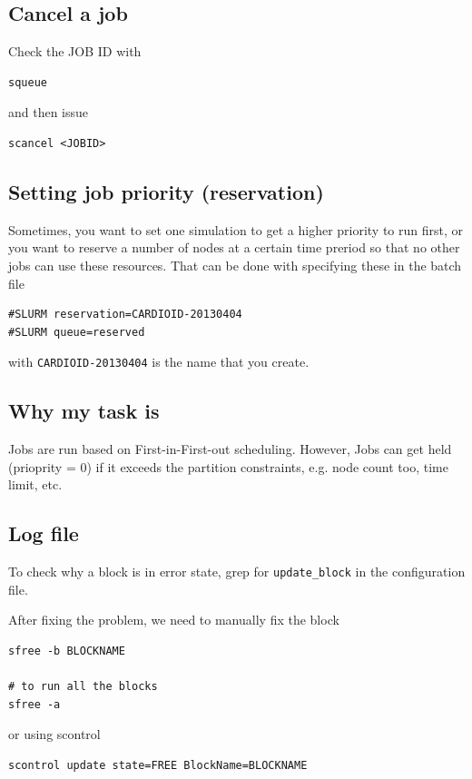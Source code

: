 \subsection{Cancel a job}

Check the JOB ID with 
\begin{verbatim}
squeue
\end{verbatim}

and then issue 
\begin{verbatim}
scancel <JOBID>
\end{verbatim}

\subsection{Setting job priority (reservation)}

Sometimes, you want to set one simulation to get a higher priority to run first,
or you want to reserve a number of nodes at a certain time preriod so that no
other jobs can use these resources. That can be done with specifying these in
the batch file

\begin{verbatim}
#SLURM reservation=CARDIOID-20130404
#SLURM queue=reserved
\end{verbatim}
with \verb!CARDIOID-20130404! is the name that you create.

\subsection{Why my task is}

Jobs are run based on First-in-First-out scheduling. However, Jobs can get held
(prioprity = 0) if it exceeds the partition constraints, e.g. node count too,
time limit, etc.

\subsection{Log file}

To check why a block is in error state, grep for \verb!update_block! in the
configuration file.

After fixing the problem, we need to manually fix the block
\begin{verbatim}
sfree -b BLOCKNAME

# to run all the blocks
sfree -a
\end{verbatim}
or using scontrol
\begin{verbatim}
scontrol update state=FREE BlockName=BLOCKNAME
\end{verbatim}

